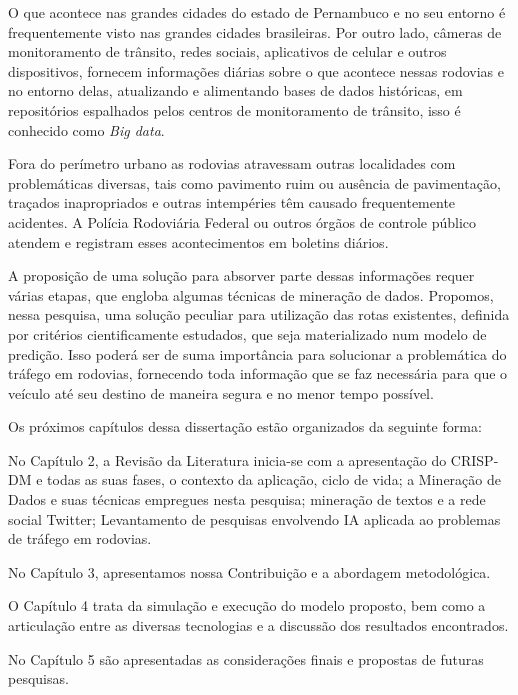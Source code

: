O que acontece nas grandes cidades do estado de Pernambuco e no seu entorno é frequentemente visto nas grandes cidades brasileiras.
Por outro lado, câmeras de monitoramento de trânsito, redes sociais, aplicativos de celular e outros dispositivos, fornecem informações diárias sobre o que acontece nessas 
rodovias e no entorno delas, atualizando e alimentando bases de dados históricas, em repositórios espalhados pelos centros de 
monitoramento de trânsito, isso é conhecido como \textit{Big data}.

Fora do perímetro urbano as rodovias atravessam outras localidades com problemáticas diversas, tais como pavimento ruim ou ausência de pavimentação, 
traçados inapropriados e outras intempéries têm causado frequentemente acidentes.
A Polícia Rodoviária Federal ou outros órgãos de controle público atendem e registram esses acontecimentos em boletins diários.

A proposição de uma solução para absorver parte dessas informações requer várias etapas, que engloba algumas técnicas de mineração de dados.
Propomos, nessa pesquisa, uma solução peculiar para utilização das rotas existentes, definida por critérios cientificamente estudados, que seja materializado num modelo de predição.
Isso poderá ser de suma importância para solucionar a problemática do tráfego em rodovias, fornecendo toda informação que se faz necessária para que o veículo até seu destino de maneira segura e no menor tempo possível.

\vspace{5mm}

Os próximos capítulos dessa dissertação estão organizados da seguinte forma:
\vspace{2mm}

No Capítulo 2, a Revisão da Literatura inicia-se com a apresentação do CRISP-DM  e todas as suas fases, o contexto da aplicação, ciclo de vida; a Mineração de Dados e suas técnicas empregues nesta pesquisa; mineração de textos e a rede social Twitter; Levantamento de pesquisas envolvendo IA aplicada ao problemas de tráfego em rodovias.  

No Capítulo 3, apresentamos nossa Contribuição e a abordagem metodológica.

O Capítulo 4 trata da simulação e execução do modelo proposto, bem como a articulação entre as diversas tecnologias e a discussão dos resultados encontrados.

No Capítulo 5 são apresentadas as considerações finais e propostas de futuras pesquisas.



